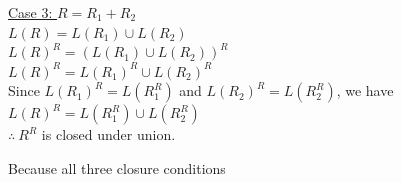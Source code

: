 \documentclass[10pt,letterpaper,unboxed,cm]{article}
\begin{document}
\begin{enumerate}
\medskip

\underline{Case 3: $R = R_1 + R_2$} \\
$L(R) = L(R_1) \cup L(R_2)$ \\
$L(R)^R = (L(R_1) \cup L(R_2))^R$ \\
$L(R)^R = L(R_1)^R \cup L(R_2)^R$ \\
Since $L(R_1)^R = L(R_1^R)$ and $L(R_2)^R = L(R_2^R)$, we have \\
$L(R)^R = L(R_1^R) \cup L(R_2^R)$ \\
$\therefore~ R^R$ is closed under union.

\medskip

Because all three closure conditions

\end{enumerate}
\end{document}
